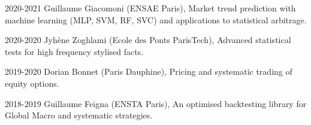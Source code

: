
\vspace{1mm}
\begin{cvskills}

  \cvskilll
    {2020-2021} %
    {} %
    {Guillaume Giacomoni (ENSAE Paris), Market trend prediction with machine learning (MLP, SVM, RF, SVC) and applications to statistical arbitrage. } %

  \cvskilll
    {2020-2020} %
    {} %
    {Jyhène Zoghlami  (Ecole des Ponts ParisTech), Advanced statistical tests for high frequency stylised facts. } %
    

  \cvskilll
    {2019-2020} %
    {} %
    { Dorian Bonnet  (Paris Dauphine), Pricing and systematic trading of equity options.} %
    
  \cvskilll
    {2018-2019} %
    {} %
    { Guillaume Feigna  (ENSTA Paris), An optimised backtesting library for Global Macro and systematic strategies.} %
    


\end{cvskills}

